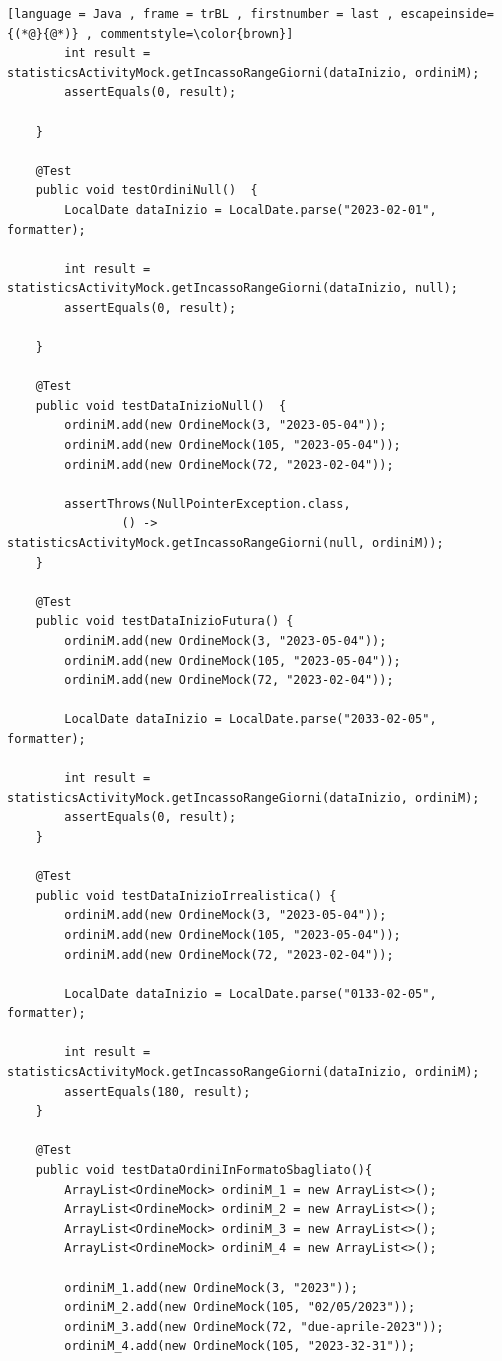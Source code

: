 \begin{lstlisting}[language = Java , frame = trBL , firstnumber = last , escapeinside={(*@}{@*)} , commentstyle=\color{brown}]
        int result = statisticsActivityMock.getIncassoRangeGiorni(dataInizio, ordiniM);
        assertEquals(0, result);

    }

    @Test
    public void testOrdiniNull()  {
        LocalDate dataInizio = LocalDate.parse("2023-02-01", formatter);

        int result = statisticsActivityMock.getIncassoRangeGiorni(dataInizio, null);
        assertEquals(0, result);

    }

    @Test
    public void testDataInizioNull()  {
        ordiniM.add(new OrdineMock(3, "2023-05-04"));
        ordiniM.add(new OrdineMock(105, "2023-05-04"));
        ordiniM.add(new OrdineMock(72, "2023-02-04"));

        assertThrows(NullPointerException.class,
                () -> statisticsActivityMock.getIncassoRangeGiorni(null, ordiniM));
    }

    @Test
    public void testDataInizioFutura() {
        ordiniM.add(new OrdineMock(3, "2023-05-04"));
        ordiniM.add(new OrdineMock(105, "2023-05-04"));
        ordiniM.add(new OrdineMock(72, "2023-02-04"));

        LocalDate dataInizio = LocalDate.parse("2033-02-05", formatter);

        int result = statisticsActivityMock.getIncassoRangeGiorni(dataInizio, ordiniM);
        assertEquals(0, result);
    }

    @Test
    public void testDataInizioIrrealistica() {
        ordiniM.add(new OrdineMock(3, "2023-05-04"));
        ordiniM.add(new OrdineMock(105, "2023-05-04"));
        ordiniM.add(new OrdineMock(72, "2023-02-04"));

        LocalDate dataInizio = LocalDate.parse("0133-02-05", formatter);

        int result = statisticsActivityMock.getIncassoRangeGiorni(dataInizio, ordiniM);
        assertEquals(180, result);
    }

    @Test
    public void testDataOrdiniInFormatoSbagliato(){
        ArrayList<OrdineMock> ordiniM_1 = new ArrayList<>();
        ArrayList<OrdineMock> ordiniM_2 = new ArrayList<>();
        ArrayList<OrdineMock> ordiniM_3 = new ArrayList<>();
        ArrayList<OrdineMock> ordiniM_4 = new ArrayList<>();

        ordiniM_1.add(new OrdineMock(3, "2023"));
        ordiniM_2.add(new OrdineMock(105, "02/05/2023"));
        ordiniM_3.add(new OrdineMock(72, "due-aprile-2023"));
        ordiniM_4.add(new OrdineMock(105, "2023-32-31"));



\end{lstlisting}
